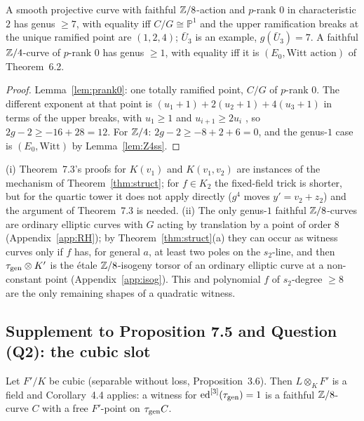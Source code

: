 \begin{corollary}\label{cor:g7}
A smooth projective curve with faithful $\mathbb Z/8$-action and $p$-rank $0$ in
characteristic $2$ has genus $\ge7$, with equality iff $C/G\cong\mathbb P^1$ and the
upper ramification breaks at the unique ramified point are $(1,2,4)$; $\bar U_3$ is an
example, $g(\bar U_3)=7$. A faithful $\mathbb Z/4$-curve of $p$-rank $0$ has genus $\ge1$, with
equality iff it is $(E_0,\text{Witt action})$ of Theorem~6.2. 
\end{corollary}

\begin{proof}
Lemma~\ref{lem:prank0}: one totally ramified point, $C/G$ of $p$-rank $0$. The different
exponent at that point is $(u_1+1)+2(u_2+1)+4(u_3+1)$ in terms of the upper breaks, with
$u_1\ge1$ and $u_{i+1}\ge2u_i$ \cite{Ga,Th}, so $2g-2\ge-16+28=12$. For $\mathbb Z/4$:
$2g-2\ge-8+2+6=0$, and the genus-$1$ case is $(E_0,\text{Witt})$ by
Lemma~\ref{lem:Z4ss}.
\end{proof}

\begin{remark}
(i) Theorem~7.3's proofs for $K(v_1)$ and $K(v_1,v_2)$ are instances of the mechanism
of Theorem~\ref{thm:struct}; for $f\in K_2$ the fixed-field trick is shorter, but for
the quartic tower it does not apply directly ($g^4$ moves $y'=v_2+z_2$) and the argument
of Theorem~7.3 is needed. (ii) The only genus-$1$ faithful $\mathbb Z/8$-curves are ordinary
elliptic curves with $G$ acting by translation by a point of order $8$
(Appendix~\ref{app:RH}); by Theorem~\ref{thm:struct}(a) they can occur as witness curves
only if $f$ has, for general $a$, at least two poles on the $s_2$-line, and then
$\tau_{\mathrm{gen}}\otimes K'$ is the \'etale $\mathbb Z/8$-isogeny torsor of an ordinary elliptic curve
at a non-constant point (Appendix~\ref{app:isog}). This and polynomial $f$ of
$s_2$-degree $\ge8$ are the only remaining shapes of a quadratic witness.
\end{remark}

\subsection{Supplement to Proposition 7.5 and Question (Q2): the cubic slot}

Let $F'/K$ be cubic (separable without loss, Proposition~3.6). Then $L\otimes_KF'$ is a
field and Corollary~4.4 applies: a witness for $\operatorname{ed}^{[3]}(\tau_{\mathrm{gen}})=1$ is a faithful
$\mathbb Z/8$-curve $C$ with a free $F'$-point on $\tau_{\mathrm{gen}} C$.

